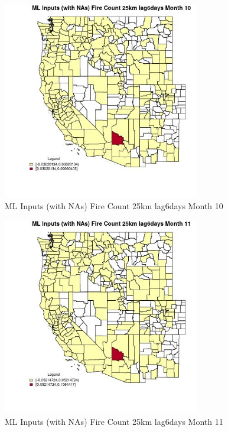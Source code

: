 \begin{figure} 
\centering  
\includegraphics[width=0.77\textwidth]{Code_Outputs/Report_ML_input_PM25_Step4_part_e_de_duplicated_aves_compiled_2019-05-20wNAs_CountyFire_Count_25km_lag6daysmedianMonth10.jpg} 
\caption{\label{fig:Report_ML_input_PM25_Step4_part_e_de_duplicated_aves_compiled_2019-05-20wNAsCountyFire_Count_25km_lag6daysmedianMonth10}ML Inputs (with NAs) Fire Count 25km lag6days Month 10} 
\end{figure} 
 

\begin{figure} 
\centering  
\includegraphics[width=0.77\textwidth]{Code_Outputs/Report_ML_input_PM25_Step4_part_e_de_duplicated_aves_compiled_2019-05-20wNAs_CountyFire_Count_25km_lag6daysmedianMonth11.jpg} 
\caption{\label{fig:Report_ML_input_PM25_Step4_part_e_de_duplicated_aves_compiled_2019-05-20wNAsCountyFire_Count_25km_lag6daysmedianMonth11}ML Inputs (with NAs) Fire Count 25km lag6days Month 11} 
\end{figure} 
 


